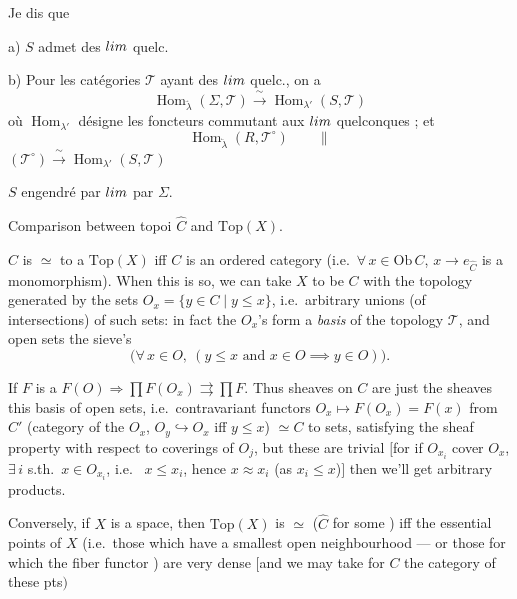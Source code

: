 \documentclass[11pt,a4paper]{article}
\begin{document}
Je dis que

a) $S$ admet des $\varinjlim$ quelc.

b) Pour les catégories $\mathcal{T}$ ayant des $\varinjlim$ quelc., on a
\[
\operatorname{Hom}_{\underrightarrow{\lambda}}(\Sigma, \mathcal{T})
\xrightarrow{\ \sim\ } \operatorname{Hom}_{\lambda'}(S, \mathcal{T})
\]
où $\operatorname{Hom}_{\lambda'}$ désigne les foncteurs commutant aux
$\varinjlim$ quelconques ; et
\[
\operatorname{Hom}_{\underleftarrow{\lambda}}(R, \mathcal{T}^{\circ})
\qquad \parallel
\]
\ill{} $(\mathcal{T}^{\circ}) \xrightarrow{\ \sim\ }
\operatorname{Hom}_{\lambda'}(S, \mathcal{T})$

$S$ engendré par $\varinjlim$ par $\Sigma$.


Comparison between topoi $\widehat{C}$ and $\mathrm{Top}(X)$.

$\widehat{C}$ is $\simeq$ to a $\mathrm{Top}(X)$ iff $C$ is an ordered category
(i.e.\ $\forall\, x \in \mathrm{Ob}\,C$, $x \to e_{\widehat{C}}$ is a
monomorphism). When this is so, we can take $X$ to be $C$ with the topology
generated by the sets $O_{x} = \{ y \in C \mid y \leq x \}$, i.e.\ arbitrary
unions (of intersections) of such sets: in fact \struck{\ill{}} the $O_{x}$'s form
a \emph{basis} of the topology $\mathcal{T}$, and open  sets  the \struck{\ill{}} sieve's
\[
\bigl( \forall\, x \in O,\ (y \leq x \text{ and }
x \in O \implies y \in O) \bigr).
\]

If $F$ is a  $F(O) \Longrightarrow \prod F(O_{x})
\rightrightarrows \prod F$. Thus sheaves on $C$ are just the sheaves \ill{} this
basis of open sets, i.e.\ contravariant functors $O_{x} \mapsto F(O_{x}) = F(x)$
from $C'$ \struck{\ill{}} (category of the $O_{x}$, $O_{y} \hookrightarrow O_{x}$
iff $y \leq x$) $\simeq C$ to sets, satisfying the sheaf property
\struck{\ill{}} with respect to \struck{\ill{}} coverings of $O_{j}$, but these
are trivial $[$for if $O_{x_{i}}$ cover $O_{x}$, $\exists\, i$ s.th.\
$x \in O_{x_{i}}$, i.e.\  $x \leq x_{i}$, hence $x \approx x_{i}$
(as $x_{i} \leq x$)$]$ then we'll get arbitrary products.

Conversely, if $X$ is a  space, then $\mathrm{Top}(X)$ is
$\simeq$ ($\widehat{C}$ for some \ill{}) iff the \struck{\ill{}} essential points
of $X$ (i.e.\ those which have a smallest open neighbourhood --- or those for
which the fiber functor \struck{commutes with products}) are very dense $[$and we
may take for $C$ the category of these pts$)$
\end{document}
